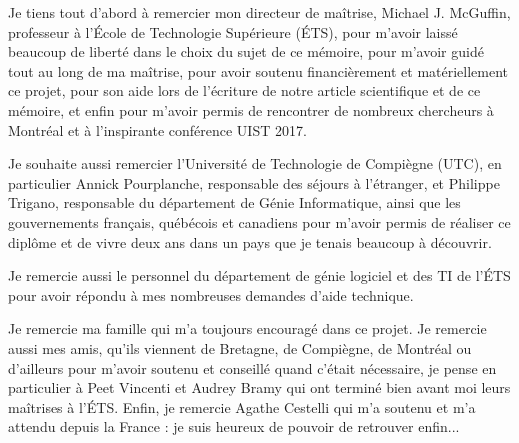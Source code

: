 Je tiens tout d'abord à remercier mon directeur de maîtrise, Michael J. McGuffin, professeur à l'École de Technologie Supérieure (ÉTS), pour m'avoir laissé beaucoup de liberté dans le choix du sujet de ce mémoire, pour m'avoir guidé tout au long de ma maîtrise, pour avoir soutenu financièrement et matériellement ce projet, pour son aide lors de l'écriture de notre article scientifique et de ce mémoire, et enfin pour m'avoir permis de rencontrer de nombreux chercheurs à Montréal et à l'inspirante conférence UIST 2017.

Je souhaite aussi remercier l'Université de Technologie de Compiègne (UTC), en particulier Annick Pourplanche, responsable des séjours à l'étranger, et Philippe Trigano, responsable du département de Génie Informatique, ainsi que les gouvernements français, québécois et canadiens pour m'avoir permis de réaliser ce diplôme et de vivre deux ans dans un pays que je tenais beaucoup à découvrir.

Je remercie aussi le personnel du département de génie logiciel et des TI de l'ÉTS pour avoir répondu à mes nombreuses demandes d'aide technique.

Je remercie ma famille qui m'a toujours encouragé dans ce projet. Je remercie aussi mes amis, qu'ils viennent de Bretagne, de Compiègne, de Montréal ou d'ailleurs pour m'avoir soutenu et conseillé quand c'était nécessaire, je pense en particulier à Peet Vincenti et Audrey Bramy qui ont terminé bien avant moi leurs maîtrises à l'ÉTS. Enfin, je remercie Agathe Cestelli qui m'a soutenu et m'a attendu depuis la France : je suis heureux de pouvoir de retrouver enfin...